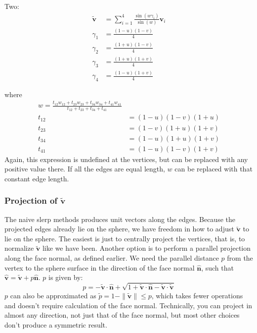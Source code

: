 \documentclass{amsart}[12pt]
\begin{document}
Two:
\begin{equation}\begin{split}\label{eq:nsq2}
     \widetilde{\mathbf v} & = \sum_{i=1}^4\frac{\sin(w\gamma_i)}{\sin(w)} \mathbf v_i \\
\gamma_1 & = \frac{(1-u)(1-v)}{4} \\
\gamma_2 & = \frac{(1+u)(1-v)}{4} \\
\gamma_3 & = \frac{(1+u)(1+v)}{4} \\
\gamma_4 & = \frac{(1-u)(1+v)}{4}
\end{split}\end{equation}

where
\begin{equation}\begin{split}
  w = \frac{t_{12} w_{12} + t_{23} w_{23} + t_{34} w_{34} + t_{41} w_{41}}
              {t_{12} + t_{23} + t_{34} + t_{41}}\\
  t_{12} &= (1-u)(1-v)(1+u) \\
  t_{23} &= (1-v)(1+u)(1+v) \\
  t_{34} &= (1-u)(1+u)(1+v) \\
  t_{41} &= (1-u)(1-v)(1+v)
\end{split}\end{equation}
Again, this expression is undefined at the vertices, but can be replaced with
any positive value there. If all the edges are equal length, $w$ can be
replaced with that constant edge length.

\subsubsection{Projection of $\widetilde{\mathbf v}$}
The naive slerp methods produces unit vectors along the edges. Because the
projected edges already lie on the sphere, we have freedom in how to adjust
$\widetilde{\mathbf v}$ to lie on the sphere. The easiest is just to centrally
project the vertices, that is, to normalize $\widetilde{\mathbf v}$ like we
have been. Another option is to perform a parallel projection along the
face normal, as defined earlier. We need the parallel distance $p$ from the
vertex to the sphere surface in the direction of the face normal
$\hat{\mathbf n}$, such that $\hat{\mathbf v} =
\widetilde{\mathbf v} + p\hat{\mathbf n}$. $p$ is given by:
\begin{equation}
   p = -\widetilde{\mathbf v} \cdot \hat{\mathbf n} +
   \sqrt{1+\widetilde{\mathbf v} \cdot \hat{\mathbf n}-\widetilde{\mathbf v} \cdot \widetilde{\mathbf v}}
\end{equation}
$p$ can also be approximated as $\widetilde{p} = 1 - \|\widetilde{\mathbf v}\|
\leq p$, which takes fewer operations and doesn't require
calculation of the face normal. Technically, you can project in almost any
direction, not just that of the face normal, but most other choices don't
produce a symmetric result.
\end{document}
